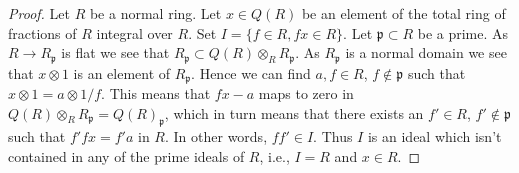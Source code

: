 \documentclass[10pt,a4paper]{amsart}
\theoremstyle{plain}
\theoremstyle{definition}
\theoremstyle{remark}
\numberwithin{equation}{subsection}
\begin{document}
\begin{proof}
Let $R$ be a normal ring. Let $x \in Q(R)$ be an element of the total ring
of fractions of $R$ integral over $R$. Set $I = \{f \in R, fx \in R\}$. Let
$\mathfrak p \subset R$ be a prime. As $R \to R_{\mathfrak p}$ is
flat we see that $R_{\mathfrak p} \subset Q(R) \otimes_R R_{\mathfrak p}$. As
$R_{\mathfrak p}$ is a normal domain we see that $x \otimes 1$ is an element of
$R_{\mathfrak p}$. Hence we can find $a, f \in R$, $f \not \in \mathfrak p$
such that $x \otimes 1 = a \otimes 1/f$. This means that $fx - a$ maps to
zero in $Q(R) \otimes_R R_{\mathfrak p} = Q(R)_{\mathfrak p}$, which
in turn means that there exists an $f' \in R$, $f' \not \in \mathfrak p$
such that $f'fx = f'a$ in $R$. In other words, $ff' \in I$. Thus $I$
is an ideal which isn't contained in any of the prime ideals of $R$, i.e.,
$I = R$ and $x \in R$.
\end{proof}
\end{document}
